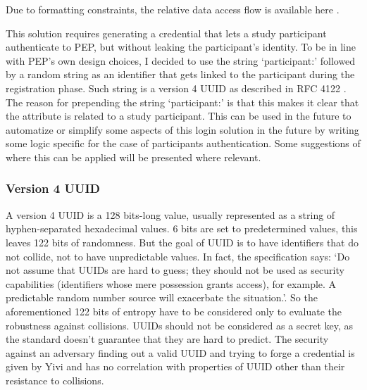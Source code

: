 \documentclass{report}
\begin{document}
Due to formatting constraints, the relative data access flow is available here \cite{data-access-failed-attempt-bpmn-diagram}.

This solution requires generating a credential that lets a study participant authenticate to PEP, but without leaking the participant's identity. To be in line with PEP's own
design choices, I decided to use the string \enquote*{participant:} followed by a random string as an identifier that gets linked to the participant during the registration phase. Such string is 
a version 4 UUID as described in RFC 4122 \cite{uuid_rfc}. The reason for prepending the string \enquote*{participant:} is that this makes it clear that the attribute is related to
a study participant. This can be used in the future to automatize or simplify some aspects of this login solution in the future by writing some logic specific for the case of
participants authentication. Some suggestions of where this can be applied will be presented where relevant.

\subsubsection{Version 4 UUID}
A version 4 UUID is a 128 bits-long value, usually represented as a string of hyphen-separated hexadecimal values. 6 bits are set to predetermined values, this leaves 122 bits of
randomness. But the goal of UUID is to have identifiers that do not collide, not to have unpredictable values. In fact, the specification says: \enquote*{Do not assume that UUIDs are 
hard to guess; they should not be used as security capabilities (identifiers whose mere possession grants access), for example. A predictable random number source will exacerbate the
situation.}. So the aforementioned 122 bits of entropy have to be considered only to evaluate the robustness against collisions. UUIDs should not be considered as a secret key, as
the standard doesn't guarantee that they are hard to predict. The security against an adversary finding out a valid UUID and trying to forge a credential is given by Yivi and has
no correlation with properties of UUID other than their resistance to collisions.
\end{document}
